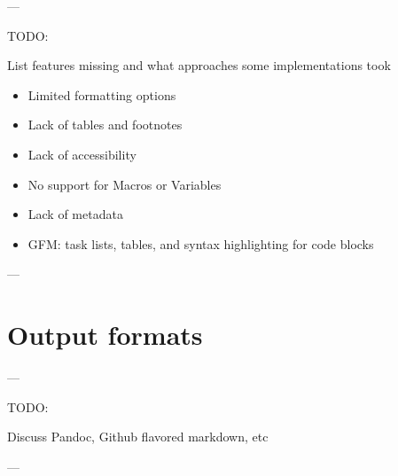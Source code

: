---

TODO:

List features missing and what approaches some implementations took

\begin{itemize}
    \item Limited formatting options
    \item Lack of tables and footnotes
    \item Lack of accessibility
    \item No support for Macros or Variables
    \item Lack of metadata
    \item GFM: task lists, tables, and syntax highlighting for code blocks
\end{itemize}

---

\section{Output formats}

---

TODO:

Discuss Pandoc, Github flavored markdown, etc

---